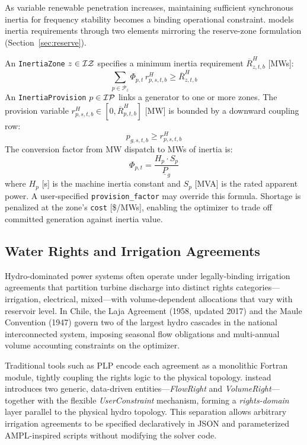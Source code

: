 As variable renewable penetration increases, maintaining sufficient
synchronous inertia for frequency stability becomes a binding operational
constraint.  \gtopt{} models inertia requirements through two elements
mirroring the reserve-zone formulation (Section~\ref{sec:reserve}).

An \texttt{InertiaZone} $z \in \mathcal{IZ}$ specifies a minimum inertia
requirement $\overline{R}_{z,t,b}^{H}$ [MWs]:
\begin{equation}
\label{eq:inertia_req}
\sum_{p \in \mathcal{P}_z} \Phi_{p,t} \, r_{p,s,t,b}^{H}
  \geq \overline{R}_{z,t,b}^{H}
\end{equation}
An \texttt{InertiaProvision} $p \in \mathcal{IP}$ links a generator to
one or more zones.  The provision variable
$r_{p,s,t,b}^{H} \in [0, \overline{R}_{p,t,b}^{H}]$ [MW] is bounded
by a downward coupling row:
\begin{equation}
\label{eq:inertia_coupling}
p_{g,s,t,b} \geq r_{p,s,t,b}^{H}
\end{equation}
The conversion factor from MW dispatch to MWs of inertia is:
\begin{equation}
\Phi_{p,t} = \frac{H_p \cdot S_p}{\underline{P}_g}
\end{equation}
where $H_p$ [s] is the machine inertia constant and $S_p$ [MVA] is the
rated apparent power.  A user-specified \texttt{provision\_factor} may
override this formula.  Shortage is penalized at the zone's
\texttt{cost} [\$/MWs], enabling the optimizer to trade off committed
generation against inertia value.

\subsection{Water Rights and Irrigation Agreements}
\label{sec:rights}

Hydro-dominated power systems often operate under legally-binding
irrigation agreements that partition turbine discharge into distinct
rights categories---irrigation, electrical, mixed---with
volume-dependent allocations that vary with reservoir level.  In Chile,
the Laja Agreement (1958, updated 2017) and the Maule Convention (1947)
govern two of the largest hydro cascades in the national interconnected
system, imposing seasonal flow obligations and multi-annual volume
accounting constraints on the optimizer.

Traditional tools such as PLP encode each agreement as a monolithic
Fortran module, tightly coupling the rights logic to the physical
topology.  \gtopt{} instead introduces two generic, data-driven
entities---\emph{FlowRight} and \emph{VolumeRight}---together with
the flexible \emph{UserConstraint} mechanism, forming a
\emph{rights-domain} layer parallel to the physical hydro topology.
This separation allows arbitrary irrigation agreements to be specified
declaratively in JSON and parameterized AMPL-inspired scripts without
modifying the solver code.

